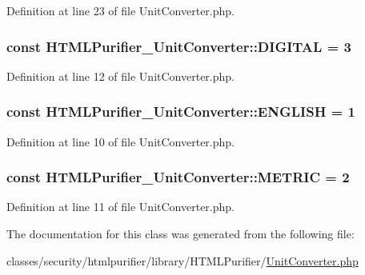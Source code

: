 Definition at line 23 of file Unit\+Converter.\+php.

\hypertarget{classHTMLPurifier__UnitConverter_af011380387649c67b6da8487cdd161d4}{
\subsubsection[{D\+I\+G\+I\+T\+A\+L}]{\setlength{\rightskip}{0pt plus 5cm}const H\+T\+M\+L\+Purifier\+\_\+\+Unit\+Converter\+::\+D\+I\+G\+I\+T\+A\+L = 3}}\label{classHTMLPurifier__UnitConverter_af011380387649c67b6da8487cdd161d4}


Definition at line 12 of file Unit\+Converter.\+php.

\hypertarget{classHTMLPurifier__UnitConverter_ab06911eda63b4eb89793cfa661d51b4e}{
\subsubsection[{E\+N\+G\+L\+I\+S\+H}]{\setlength{\rightskip}{0pt plus 5cm}const H\+T\+M\+L\+Purifier\+\_\+\+Unit\+Converter\+::\+E\+N\+G\+L\+I\+S\+H = 1}}\label{classHTMLPurifier__UnitConverter_ab06911eda63b4eb89793cfa661d51b4e}


Definition at line 10 of file Unit\+Converter.\+php.

\hypertarget{classHTMLPurifier__UnitConverter_ad7a3bb856734b87a65a7f19316bcb923}{
\subsubsection[{M\+E\+T\+R\+I\+C}]{\setlength{\rightskip}{0pt plus 5cm}const H\+T\+M\+L\+Purifier\+\_\+\+Unit\+Converter\+::\+M\+E\+T\+R\+I\+C = 2}}\label{classHTMLPurifier__UnitConverter_ad7a3bb856734b87a65a7f19316bcb923}


Definition at line 11 of file Unit\+Converter.\+php.



The documentation for this class was generated from the following file\+:\begin{DoxyCompactItemize}
\item 
classes/security/htmlpurifier/library/\+H\+T\+M\+L\+Purifier/\hyperlink{UnitConverter_8php}{Unit\+Converter.\+php}\end{DoxyCompactItemize}
